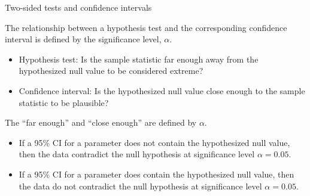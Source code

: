 \documentclass[
  ignorenonframetext,
  aspectratio=169]{beamer}
\begin{document}
\begin{frame}{Two-sided tests and confidence intervals}
\protect\hypertarget{two-sided-tests-and-confidence-intervals}{}
\small

The relationship between a hypothesis test and the corresponding
confidence interval is defined by the significance level, \(\alpha\).

\begin{itemize}
\item
  Hypothesis test: Is the sample statistic far enough away from the
  hypothesized null value to be considered extreme?
\item
  Confidence interval: Is the hypothesized null value close enough to
  the sample statistic to be plausible?
\end{itemize}

The ``far enough'' and ``close enough'' are defined by \(\alpha\).

\begin{itemize}
\item
  If a 95\% CI for a parameter does not contain the hypothesized null
  value, then the data contradict the null hypothesis at significance
  level \(\alpha = 0.05\).
\item
  If a 95\% CI for a parameter does contain the hypothesized null value,
  then the data do not contradict the null hypothesis at significance
  level \(\alpha = 0.05\).
\end{itemize}
\end{frame}
\end{document}
